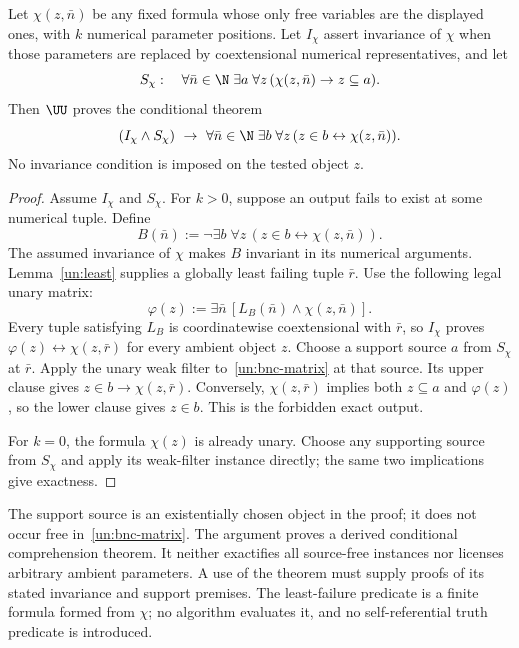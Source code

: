 \begin{theorem}\label{un:bnc}
Let $\chi(z,\bar n)$ be any fixed formula whose only free variables are
the displayed ones, with $k$ numerical parameter positions. Let
$I_\chi$ assert invariance of $\chi$ when those parameters are replaced
by coextensional numerical representatives, and let
\[
 S_\chi:\quad
 \forall\bar n\in\N\;\exists a\;\forall z\,
                       (\chi(z,\bar n)\to z\subseteq a).
\]
Then $\UU$ proves the conditional theorem
\begin{equation}\label{un:bnc-statement}
 (I_\chi\land S_\chi)\ \to\
 \forall\bar n\in\N\;\exists b\;\forall z\,
                       (z\in b\leftrightarrow\chi(z,\bar n)).
\end{equation}
No invariance condition is imposed on the tested object $z$.
\end{theorem}
\begin{proof}
Assume $I_\chi$ and $S_\chi$. For $k>0$, suppose an output fails to
exist at some numerical tuple. Define
\[
 B(\bar n):=\neg\exists b\;\forall z\,
                          (z\in b\leftrightarrow\chi(z,\bar n)).
\]
The assumed invariance of $\chi$ makes $B$ invariant in its numerical
arguments. Lemma~\ref{un:least} supplies a globally least failing tuple
$\bar r$. Use the following legal unary matrix:
\begin{equation}\label{un:bnc-matrix}
           \varphi(z):=\exists\bar n\,
                         [L_B(\bar n)\land\chi(z,\bar n)].
\end{equation}
Every tuple satisfying $L_B$ is coordinatewise coextensional with
$\bar r$, so $I_\chi$ proves
$\varphi(z)\leftrightarrow\chi(z,\bar r)$ for every ambient object
$z$. Choose a support source $a$ from $S_\chi$ at $\bar r$. Apply
the unary weak filter to~\eqref{un:bnc-matrix} at that source. Its
upper clause gives $z\in b\to\chi(z,\bar r)$. Conversely,
$\chi(z,\bar r)$ implies both $z\subseteq a$ and $\varphi(z)$, so
the lower clause gives $z\in b$. This is the forbidden exact output.

For $k=0$, the formula $\chi(z)$ is already unary. Choose any supporting
source from $S_\chi$ and apply its weak-filter instance directly; the
same two implications give exactness.
\end{proof}

The support source is an existentially chosen object in the proof; it
does not occur free in~\eqref{un:bnc-matrix}. The argument proves a
derived conditional comprehension theorem. It neither exactifies all
source-free instances nor licenses arbitrary ambient parameters. A use
of the theorem must supply proofs of its stated invariance and support
premises. The least-failure predicate is a finite formula formed from
$\chi$; no algorithm evaluates it, and no self-referential truth
predicate is introduced.

